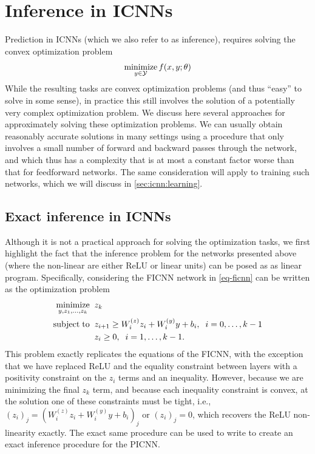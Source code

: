 \section{Inference in ICNNs}
\label{sec:icnn:inf}

Prediction in ICNNs (which we also refer to as inference), requires
solving the convex optimization problem
\begin{equation}
\label{eq-min-2}
\operatorname*{minimize}_{y \in \mathcal{Y}} f(x,y;\theta)
\end{equation}
While the resulting tasks are convex optimization problems (and thus
``easy'' to solve in some sense), in practice this still involves the solution
of a potentially very complex optimization problem.
We discuss here several approaches for approximately solving these optimization
problems.  We can usually obtain reasonably accurate solutions
in many settings using a procedure that only involves a small number of forward
and backward passes through the network, and which thus has a complexity that
is at most a constant factor worse than that for feedforward networks.
The same consideration will apply to training such networks, which we will
discuss in \cref{sec:icnn:learning}.

\subsection{Exact inference in ICNNs}
Although it is not a practical approach for solving the optimization tasks, we
first highlight the fact that the inference problem for the networks
presented above (where the non-linear are either ReLU or linear units) can be
posed as as linear program.  Specifically, considering the FICNN network in
\eqref{eq-ficnn} can be written as the optimization problem
\begin{equation}
\begin{split}
\operatorname*{minimize}_{y,z_1,\ldots,z_k} \;\; & z_k \\
 \operatorname*{subject\;to} \;\; & z_{i+1} \geq W^{(z)}_i z_i + W^{(y)}_i y + b_i,  \;\;
 i=0,\ldots,k-1 \\
& z_i \geq 0, \;\; i=1,\ldots,k-1.
\end{split}
\end{equation}
This problem exactly replicates the equations of the FICNN, with the exception
that we have replaced ReLU and the equality constraint between layers with a
positivity constraint on the $z_i$ terms and an inequality.  However, because we
are minimizing the final $z_k$ term, and because each inequality constraint is
convex, at the solution one of these constraints must be tight, i.e., $(z_i)_j
= (W^{(z)}_i z_i + W^{(y)}_i y + b_i)_j$ or $(z_i)_j = 0$, which recovers the
ReLU non-linearity exactly.  The exact same procedure can be used to write to
create an exact inference procedure for the PICNN.

